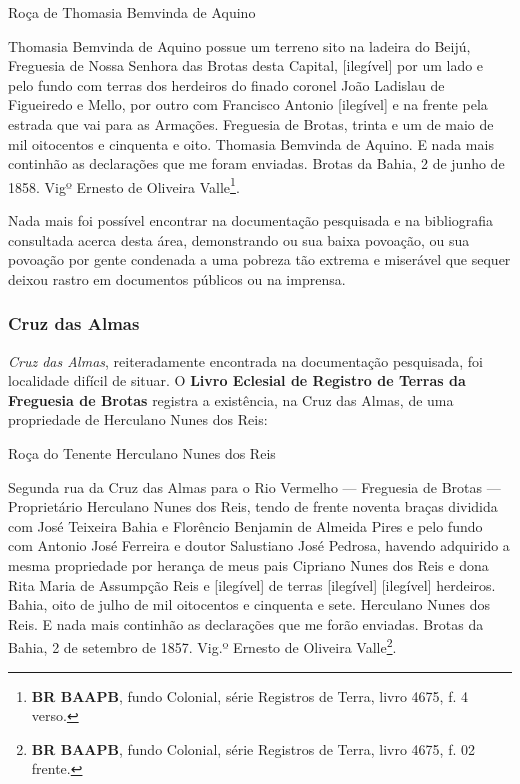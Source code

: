 \begin{citacao}
Roça de Thomasia Bemvinda de Aquino

Thomasia Bemvinda de Aquino possue um terreno sito na ladeira do Beijú, Freguesia de Nossa Senhora das Brotas desta Capital, [ilegível] por um lado e pelo fundo com terras dos herdeiros do finado coronel João Ladislau de Figueiredo e Mello, por outro com Francisco Antonio [ilegível] e na frente pela estrada que vai para as Armações. Freguesia de Brotas, trinta e um de maio de mil oitocentos e cinquenta e oito. Thomasia Bemvinda de Aquino. E nada mais continhão as declarações que me foram enviadas. Brotas da Bahia, 2 de junho de 1858. Vigº Ernesto de Oliveira Valle\footnote{\textbf{BR BAAPB}, fundo Colonial, série Registros de Terra, livro 4675, f. 4 verso.}. 
\end{citacao}

Nada mais foi possível encontrar na documentação pesquisada e na bibliografia consultada acerca desta área, demonstrando ou sua baixa povoação, ou sua povoação por gente condenada a uma pobreza tão extrema e miserável que sequer deixou rastro em documentos públicos ou na imprensa.

\subsubsection{Cruz das Almas}\label{subsubsec:cruzalm}

\textit{Cruz das Almas}, reiteradamente encontrada na documentação pesquisada, foi localidade difícil de situar. O \textbf{Livro Eclesial de Registro de Terras da Freguesia de Brotas} registra a existência, na Cruz das Almas, de uma propriedade de Herculano Nunes dos Reis:

\begin{citacao}
Roça do Tenente Herculano Nunes dos Reis

Segunda rua da Cruz das Almas para o Rio Vermelho --- Freguesia de Brotas --- Proprietário Herculano Nunes dos Reis, tendo de frente noventa braças dividida com José Teixeira Bahia e Florêncio Benjamin de Almeida Pires e pelo fundo com Antonio José Ferreira e doutor Salustiano José Pedrosa, havendo adquirido a mesma propriedade por herança de meus pais Cipriano Nunes dos Reis e dona Rita Maria de Assumpção Reis e [ilegível] de terras [ilegível] [ilegível] herdeiros. Bahia, oito de julho de mil oitocentos e cinquenta e sete. Herculano Nunes dos Reis. E nada mais continhão as declarações que me forão enviadas. Brotas da Bahia, 2 de setembro de 1857. Vig.º Ernesto de Oliveira Valle\footnote{\textbf{BR BAAPB}, fundo Colonial, série Registros de Terra, livro 4675, f. 02 frente.}.
\end{citacao}

